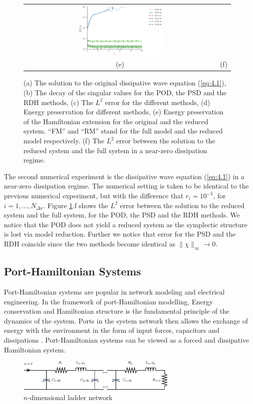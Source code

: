 \begin{figure}[t]
\begin{tabular}{cc}
\includegraphics[width=0.45\textwidth]{./figs/wave/error_homo} \\
(e) & (f) 
\end{tabular}
\caption{(a) The solution to the original dissipative wave equation (\ref{eq:4.1}), (b) The decay of the singular values for the POD, the PSD and the RDH methods, (c) The $L^2$ error for the different methods, (d) Energy preservation for different methods, (e) Energy preservation of the Hamiltonian extension for the original and the reduced system. ``FM'' and ``RM'' stand for the full model and the reduced model respectively. (f) The $L^2$ error between the solution to the reduced system and the full system in a near-zero dissipation regime.} \label{fig:4.1}
\end{figure}

The second numerical experiment is the dissipative wave equation (\ref{eq:4.1}) in a near-zero dissipation regime. The numerical setting is taken to be identical to the previous numerical experiment, but with the difference that $r_i = 10^{-5}$, for $i=1,\dots,N_{\Delta x}$. Figure \ref{fig:4.1}.f shows the $L^2$ error between the solution to the reduced system and the full system, for the POD, the PSD and the RDH methods. We notice that the POD does not yield a reduced system as the symplectic structure is lost via model reduction. Further we notice that error for the PSD and the RDH coincide since the two methods become identical as $\| \chi \|_{\infty}\to 0$.

\subsection{Port-Hamiltonian Systems}
Port-Hamiltonian systems are popular in network modeling and electrical engineering. In the framework of port-Hamiltonian modelling, Energy conservation and Hamiltonian structure is the fundamental principle of the dynamics of the system. Ports in the system network then allows the exchange of energy with the environment in the form of input forces, capacitors and dissipations \cite{vanderSchaft:2014:PST:2693645.2693646}. Port-Hamiltonian systems can be viewed as a forced and dissipative Hamiltonian system.
\begin{figure}[t]
\begin{center}
	\includegraphics[width=0.7\textwidth]{./figs/porthamil/circuit}
\end{center}
\caption{$n$-dimensional ladder network} \label{fig:4.2}
\end{figure}

